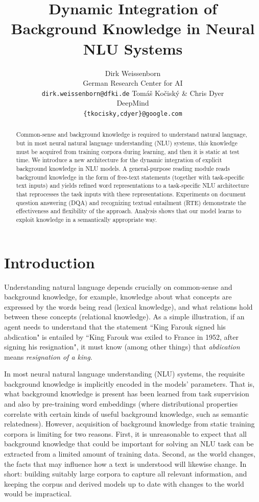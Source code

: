 \documentclass[11pt,a4paper]{article}
\title{Dynamic Integration of Background Knowledge in Neural NLU Systems}
\author{Dirk Weissenborn \\
German Research Center for AI \\
{\tt dirk.weissenborn@dfki.de}
\And
{Tom\'{a}\v{s} Ko\v{c}isk\'{y} \& Chris Dyer} \\
DeepMind \\
{\tt \{tkocisky,cdyer\}@google.com}
}
\date{}
\begin{document}
\maketitle
\begin{abstract}
Common-sense and background knowledge is required to understand natural language, but in most neural natural language understanding (NLU) systems, this knowledge must be acquired from training corpora during learning, and then it is static at test time. We introduce a new architecture for the dynamic integration of explicit background knowledge in NLU models. A general-purpose reading module reads background knowledge in the form of free-text statements (together with task-specific text inputs) and yields refined word representations to a task-specific NLU architecture that reprocesses the task inputs with these representations. Experiments on document question answering (DQA) and recognizing textual entailment (RTE) demonstrate the effectiveness and flexibility of the approach. Analysis shows that our model learns to exploit knowledge in a semantically appropriate way.
\end{abstract}

\section{Introduction}
Understanding natural language depends crucially on common-sense and background knowledge, for example, knowledge about what concepts are expressed by the words being read (lexical knowledge), and what relations hold between these concepts (relational knowledge). As a simple illustration, if an agent needs to understand that the statement ``King Farouk signed his abdication" is entailed by ``King Farouk was exiled to France in 1952, after signing his resignation", it must know (among other things) that \emph{abdication} means \emph{resignation of a king}.

In most neural natural language understanding (NLU) systems, the requisite background knowledge is implicitly encoded in the models' parameters. That is, what background knowledge is present has been learned from task supervision and also by pre-training word embeddings (where distributional properties correlate with certain kinds of useful background knowledge, such as semantic relatedness). However, acquisition of background knowledge from static training corpora is limiting for two reasons. First, it is unreasonable to expect that all background knowledge that could be important for solving an NLU task can be extracted from a limited amount of training data. Second, as the world changes, the facts that may influence how a text is understood will likewise change. In short: building suitably large corpora to capture all relevant information, and keeping the corpus and derived models up to date with changes to the world would be impractical.
\end{document}
